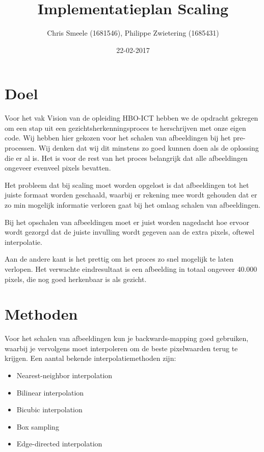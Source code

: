 \documentclass[a4paper]{article}
\author{Chris Smeele (1681546), Philippe Zwietering (1685431)}
\date{22-02-2017}
\title{Implementatieplan Scaling}
\begin{document}
\maketitle
\setcounter{tocdepth}{2}
\tableofcontents


\section{Doel}
\label{sec:org3699482}
Voor het vak Vision van de opleiding HBO-ICT hebben we de opdracht
gekregen om een stap uit een gezichtsherkenningsproces te herschrijven
met onze eigen code. Wij hebben hier gekozen voor het schalen van
afbeeldingen bij het pre-processen. Wij denken dat wij dit minstens zo
goed kunnen doen als de oplossing die er al is. Het is voor de rest
van het proces belangrijk dat alle afbeeldingen ongeveer evenveel
pixels bevatten.

Het probleem dat bij scaling moet worden opgelost is dat afbeeldingen
tot het juiste formaat worden geschaald, waarbij er rekening mee wordt
gehouden dat er zo min mogelijk informatie verloren gaat bij het
omlaag schalen van afbeeldingen.

Bij het opschalen van afbeeldingen moet er juist worden nagedacht hoe
ervoor wordt gezorgd dat de juiste invulling wordt gegeven aan de
extra pixels, oftewel interpolatie.

Aan de andere kant is het prettig om het proces zo snel mogelijk te
laten verlopen. Het verwachte eindresultaat is een afbeelding in
totaal ongeveer 40.000 pixels, die nog goed herkenbaar is als gezicht.

\section{Methoden}
\label{sec:org920bb43}

Voor het schalen van afbeeldingen kun je backwards-mapping goed gebruiken, waarbij je vervolgens moet interpoleren om de beste pixelwaarden terug te krijgen. Een aantal bekende interpolatiemethoden zijn:
\begin{itemize}
\item Nearest-neighbor interpolation
\item Bilinear interpolation
\item Bicubic interpolation
\item Box sampling
\item Edge-directed interpolation
\end{itemize}
\end{document}
